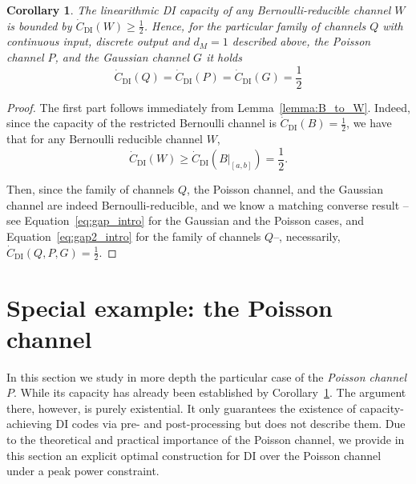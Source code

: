 \documentclass[10pt, conference]{IEEEtran}
\newtheorem{corollary}[theorem]{Corollary}
\newcommand{\1}{\mathds{1}}
\begin{document}
\begin{corollary}\label{cor:capacity_W}
The linearithmic DI capacity of any Bernoulli-reducible channel $W$ is bounded by $\dot C_\text{DI}(W)\geq\frac12$. Hence, for the particular family of channels $Q$ with continuous input, discrete output and $d_M=1$ described above, the Poisson channel $P$, and the Gaussian channel $G$ it holds 
\[
\dot C_\text{DI}(Q)=\dot C_\text{DI}(P)=\dot C_\text{DI}(G)=\frac12
\]

\end{corollary}
\begin{proof}
The first part follows immediately from Lemma~\ref{lemma:B_to_W}. Indeed, since the capacity of the restricted Bernoulli channel is $\dot C_\text{DI}(B)=\frac12$, we have that for any Bernoulli reducible channel $W$,
\begin{equation}
\dot{C}_{\text{DI}}(W) \geq \dot{C}_{\text{DI}}(B|_{[a,b]})=\frac12.
\end{equation}

Then, since the family of channels $Q$, the Poisson channel, and the Gaussian channel are indeed Bernoulli-reducible, and we know a matching converse result --see Equation~\eqref{eq:gap_intro} for the Gaussian and the Poisson cases, and Equation~\eqref{eq:gap2_intro} for the family of channels $Q$--, necessarily, $\dot C_\text{DI}(Q,P,G)=\frac12$.
\end{proof}







\section{Special example: the Poisson channel}\label{sec:poisson}
In this section we study in more depth the particular case of the \emph{Poisson channel} $P$. While its capacity has already been established by Corollary~\ref{cor:capacity_W}. The argument there, however, is purely existential. It only guarantees the existence of capacity-achieving DI codes via pre- and post-processing but does not describe them. Due to the theoretical and practical importance of the Poisson channel, we provide in this section an explicit optimal construction for DI over the Poisson channel under a peak power constraint. 
\end{document}
